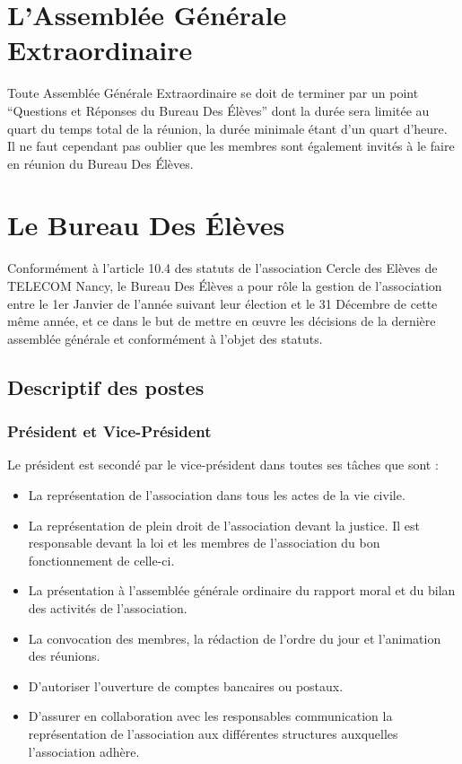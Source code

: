 \documentclass{article} %
\begin{document}
	\section{L'Assemblée Générale Extraordinaire}

		Toute Assemblée Générale Extraordinaire se doit de terminer par un point
		“Questions et Réponses du Bureau Des Élèves” dont la durée sera limitée
		au quart du temps total de la réunion, la durée minimale étant d’un
		quart d’heure. %
		Il ne faut cependant pas oublier que les membres sont également invités
		à le faire en réunion du Bureau Des Élèves.

	\section{Le Bureau Des Élèves}

			Conformément à l’article 10.4 des statuts de l’association Cercle
			des Elèves de TELECOM Nancy, le Bureau Des Élèves a pour rôle la
			gestion de l'association entre le 1er Janvier de l’année suivant
			leur élection et le 31 Décembre de cette même année, et ce dans le
			but de mettre en œuvre les décisions de la dernière assemblée
			générale et conformément à l'objet des statuts.

		\subsection{Descriptif des postes}

			\subsubsection{Président et Vice-Président}

				Le président est secondé par le vice-président dans toutes ses
				tâches que sont :
				\begin{itemize}
					\item La représentation de l’association dans tous les actes
						de la vie civile.
					\item La représentation de plein droit de l’association
						devant la justice. Il est responsable devant la loi et
						les membres de l’association du bon fonctionnement de
						celle-ci.
					\item La présentation à l’assemblée générale
						ordinaire du rapport moral et du bilan des activités de
						l’association.
					\item La convocation des membres, la rédaction de l’ordre du
						jour et l’animation des réunions.
					\item D’autoriser l’ouverture de comptes bancaires ou
						postaux.
					\item D’assurer en collaboration avec les responsables
						communication la représentation de l’association aux
						différentes structures auxquelles l’association adhère. 
				\end{itemize}
\end{document}
